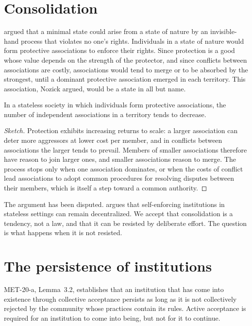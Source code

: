 \documentclass{situationist-preprint}
\begin{document}
\section{Consolidation}

\citet{Nozick1974} argued that a minimal state could arise from a state of nature by an invisible-hand process that violates no one's rights. Individuals in a state of nature would form protective associations to enforce their rights. Since protection is a good whose value depends on the strength of the protector, and since conflicts between associations are costly, associations would tend to merge or to be absorbed by the strongest, until a dominant protective association emerged in each territory. This association, Nozick argued, would be a state in all but name.

\begin{proposition}\label{p:consolidate}
In a stateless society in which individuals form protective associations, the number of independent associations in a territory tends to decrease.
\end{proposition}

\begin{proof}[Sketch]
Protection exhibits increasing returns to scale: a larger association can deter more aggressors at lower cost per member, and in conflicts between associations the larger tends to prevail. Members of smaller associations therefore have reason to join larger ones, and smaller associations reason to merge. The process stops only when one association dominates, or when the costs of conflict lead associations to adopt common procedures for resolving disputes between their members, which is itself a step toward a common authority.
\end{proof}

The argument has been disputed. \citet{Leeson2014} argues that self-enforcing institutions in stateless settings can remain decentralized. We accept that consolidation is a tendency, not a law, and that it can be resisted by deliberate effort. The question is what happens when it is not resisted.

\section{The persistence of institutions}

MET-20-a, Lemma~3.2, establishes that an institution that has come into existence through collective acceptance persists as long as it is not collectively rejected by the community whose practices contain its rules. Active acceptance is required for an institution to come into being, but not for it to continue.
\end{document}
